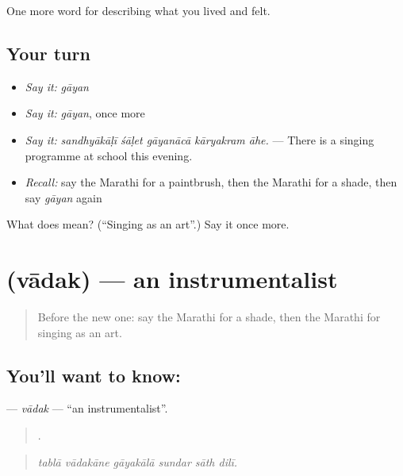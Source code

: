 \begin{grammarlens}[title={What you've built}]
One more word for describing what you lived and felt.
\end{grammarlens}

\subsection*{Your turn}
\begin{itemize}
\raggedright
  \item \emph{Say it:} \emph{gāyan}
  \item \emph{Say it:} \emph{gāyan}, once more
  \item \emph{Say it:} \emph{sandhyākāḷī śāḷet gāyanācā kāryakram āhe.} — There is a singing programme at school this evening.
  \item \emph{Recall:} say the Marathi for a paintbrush, then the Marathi for a shade, then say \emph{gāyan} again
\end{itemize}

\begin{tcolorbox}[breakable,colback=teal!4,colframe=teal!35!black,title={Before you move on}]
What does  mean? (\textquotedblleft{}Singing as an art\textquotedblright{}.) Say it once more.
\end{tcolorbox}
\section[\texorpdfstring{\mr{वादक} (vādak)}{वादक (vādak)}]{ (vādak) — an instrumentalist}

\label{lesson:MR-C536-vadak}



\begin{quote}
Before the new one: say the Marathi for a shade, then the Marathi for singing as an art.
\end{quote}

\subsection*{You'll want to know: }
\textbf{} — \emph{vādak} — \textquotedblleft{}an instrumentalist\textquotedblright{}.

\begin{quote}
     .
\end{quote}

\begin{quote}
\emph{tablā vādakāne gāyakālā sundar sāth dilī.}
\end{quote}

